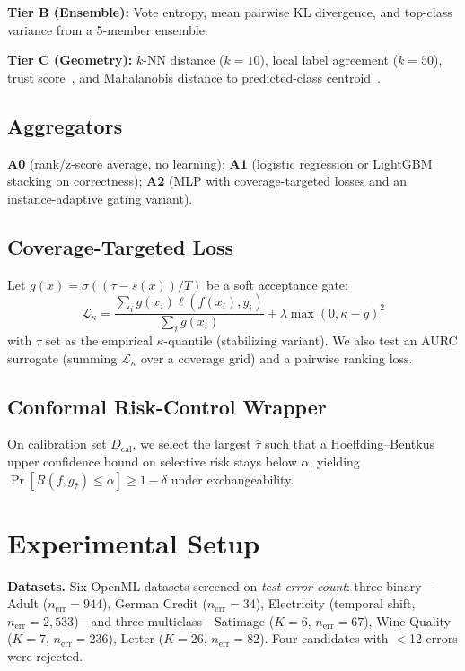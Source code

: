\documentclass[conference]{IEEEtran}
\begin{document}
\textbf{Tier B (Ensemble):} Vote entropy, mean pairwise KL divergence, and top-class variance from a 5-member ensemble.

\textbf{Tier C (Geometry):} $k$-NN distance ($k{=}10$), local label agreement ($k{=}50$), trust score~\cite{jiang2018trustscore}, and Mahalanobis distance to predicted-class centroid~\cite{lee2018mahalanobis}.

\subsection{Aggregators}
\textbf{A0} (rank/z-score average, no learning); \textbf{A1} (logistic regression or LightGBM stacking on correctness); \textbf{A2} (MLP with coverage-targeted losses and an instance-adaptive gating variant).

\subsection{Coverage-Targeted Loss}
Let $g(x) = \sigma((\tau - s(x))/T)$ be a soft acceptance gate:
\begin{equation}
  \mathcal{L}_\kappa = \frac{\sum_i g(x_i)\ell(f(x_i),y_i)}{\sum_i g(x_i)} + \lambda\max(0, \kappa - \bar{g})^2
\end{equation}
with $\tau$ set as the empirical $\kappa$-quantile (stabilizing variant). We also test an AURC surrogate (summing $\mathcal{L}_\kappa$ over a coverage grid) and a pairwise ranking loss.

\subsection{Conformal Risk-Control Wrapper}
On calibration set $D_{\mathrm{cal}}$, we select the largest $\hat\tau$ such that a Hoeffding--Bentkus upper confidence bound on selective risk stays below $\alpha$, yielding $\Pr[R(f, g_{\hat\tau}) \le \alpha] \ge 1-\delta$ under exchangeability.

\section{Experimental Setup}
\label{sec:setup}

\textbf{Datasets.} Six OpenML datasets screened on \emph{test-error count}: three binary---Adult ($n_{\mathrm{err}}{=}944$), German Credit ($n_{\mathrm{err}}{=}34$), Electricity (temporal shift, $n_{\mathrm{err}}{=}2{,}533$)---and three multiclass---Satimage ($K{=}6$, $n_{\mathrm{err}}{=}67$), Wine Quality ($K{=}7$, $n_{\mathrm{err}}{=}236$), Letter ($K{=}26$, $n_{\mathrm{err}}{=}82$). Four candidates with $<$12 errors were rejected.
\end{document}
